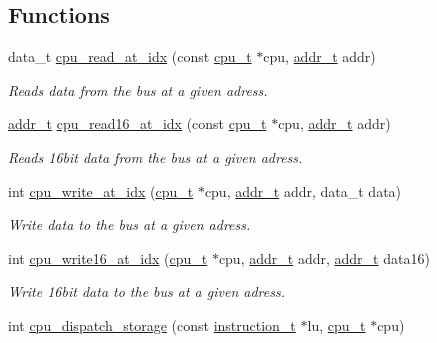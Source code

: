 \subsection*{Functions}
\begin{DoxyCompactItemize}
\item 
data\+\_\+t \hyperlink{cpu-storage_8h_a344ca7bbdfd21880efbf1fa20c5750b9}{cpu\+\_\+read\+\_\+at\+\_\+idx} (const \hyperlink{structcpu__t}{cpu\+\_\+t} $\ast$cpu, \hyperlink{memory_8h_a8a6444037e4d5cc2bf8ba22a9d9e33ca}{addr\+\_\+t} addr)
\begin{DoxyCompactList}\small\item\em Reads data from the bus at a given adress. \end{DoxyCompactList}\item 
\hyperlink{memory_8h_a8a6444037e4d5cc2bf8ba22a9d9e33ca}{addr\+\_\+t} \hyperlink{cpu-storage_8h_aa4dd23db2c717ae059d9daff6051501b}{cpu\+\_\+read16\+\_\+at\+\_\+idx} (const \hyperlink{structcpu__t}{cpu\+\_\+t} $\ast$cpu, \hyperlink{memory_8h_a8a6444037e4d5cc2bf8ba22a9d9e33ca}{addr\+\_\+t} addr)
\begin{DoxyCompactList}\small\item\em Reads 16bit data from the bus at a given adress. \end{DoxyCompactList}\item 
int \hyperlink{cpu-storage_8h_ae76e9c113ecf820b05d8b5f5db09b229}{cpu\+\_\+write\+\_\+at\+\_\+idx} (\hyperlink{structcpu__t}{cpu\+\_\+t} $\ast$cpu, \hyperlink{memory_8h_a8a6444037e4d5cc2bf8ba22a9d9e33ca}{addr\+\_\+t} addr, data\+\_\+t data)
\begin{DoxyCompactList}\small\item\em Write data to the bus at a given adress. \end{DoxyCompactList}\item 
int \hyperlink{cpu-storage_8h_a0028e52dcb528bbee5ab3945357f2729}{cpu\+\_\+write16\+\_\+at\+\_\+idx} (\hyperlink{structcpu__t}{cpu\+\_\+t} $\ast$cpu, \hyperlink{memory_8h_a8a6444037e4d5cc2bf8ba22a9d9e33ca}{addr\+\_\+t} addr, \hyperlink{memory_8h_a8a6444037e4d5cc2bf8ba22a9d9e33ca}{addr\+\_\+t} data16)
\begin{DoxyCompactList}\small\item\em Write 16bit data to the bus at a given adress. \end{DoxyCompactList}\item 
int \hyperlink{cpu-storage_8h_a59cdfbe22b2caa6792b7bbb53656e3ef}{cpu\+\_\+dispatch\+\_\+storage} (const \hyperlink{structinstruction__t}{instruction\+\_\+t} $\ast$lu, \hyperlink{structcpu__t}{cpu\+\_\+t} $\ast$cpu)

\end{DoxyCompactItemize}
